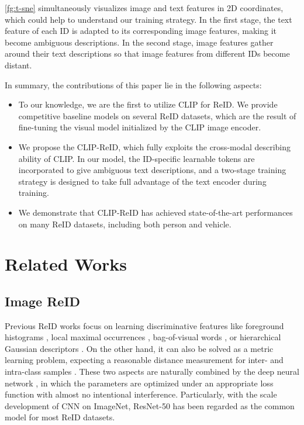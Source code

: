 \documentclass[letterpaper]{article} \usepackage{aaai23}  \usepackage{times}  \usepackage{helvet}  \usepackage{courier}  \usepackage[hyphens]{url}  \usepackage{graphicx} \urlstyle{rm} \def\UrlFont{\rm}  \usepackage{natbib}  \usepackage{caption} \frenchspacing  \setlength{\pdfpagewidth}{8.5in}  \setlength{\pdfpageheight}{11in}  \usepackage{algorithm}
\begin{document}
\cref{fg:t-sne} simultaneously visualizes image and text features in 2D coordinates, which could help to understand our training strategy. In the first stage, the text feature of each ID is adapted to its corresponding image features, making it become ambiguous descriptions. In the second stage, image features gather around their text descriptions so that image features from different IDs become distant. 

In summary, the contributions of this paper lie in the following aspects:

\begin{itemize}
    \item To our knowledge, we are the first to utilize CLIP for ReID. We provide competitive baseline models on several ReID datasets, which are the result of fine-tuning the visual model initialized by the CLIP image encoder.
    \item We propose the CLIP-ReID, which fully exploits the cross-modal describing ability of CLIP. In our model, the ID-specific learnable tokens are incorporated to give ambiguous text descriptions, and a two-stage training strategy is designed to take full advantage of the text encoder during training.
    \item We demonstrate that CLIP-ReID has achieved state-of-the-art performances on many ReID datasets, including both person and vehicle.
\end{itemize}



\section{Related Works}
\subsection{Image ReID} Previous ReID works focus on learning discriminative features like foreground histograms \cite{das2014consistent}, local maximal occurrences \cite{liao2015person}, bag-of-visual words \cite{market1501}, or hierarchical Gaussian descriptors \cite{matsukawa2016hierarchical}. On the other hand, it can also be solved as a metric learning problem, expecting a reasonable distance measurement for inter- and intra-class samples \cite{koestinger2012large}. These two aspects are naturally combined by the deep neural network \cite{yi2014deep}, in which the parameters are optimized under an appropriate loss function with almost no intentional interference. Particularly, with the scale development of CNN on ImageNet, ResNet-50 \cite{ResNet} has been regarded as the common model \cite{strongbaseline} for most ReID datasets. 
\end{document}
